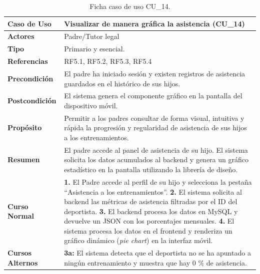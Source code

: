         \begin{table}[htbp]
        \centering
        \footnotesize
        \renewcommand{\arraystretch}{0.95}
        \begin{tabularx}{\textwidth}{|l|X|}
        \hline
        \rowcolor[HTML]{EFEFEF} 
        \textbf{Caso de Uso} & \textbf{Visualizar de manera gráfica la asistencia (CU\_14)} \\ \hline
        \textbf{Actores} & Padre/Tutor legal \\ \hline
        \textbf{Tipo} & Primario y esencial. \\ \hline
        \textbf{Referencias} & RF5.1, RF5.2, RF5.3, RF5.4 \\ \hline
        \textbf{Precondición} & El padre ha iniciado sesión y existen registros de asistencia guardados en el histórico de sus hijos. \\ \hline
        \textbf{Postcondición} & El sistema genera el componente gráfico en la pantalla del dispositivo móvil. \\ \hline
        \textbf{Propósito} & Permitir a los padres consultar de forma visual, intuitiva y rápida la progresión y regularidad de asistencia de sus hijos a los entrenamientos. \\ \hline
        \textbf{Resumen} & El padre accede al panel de asistencia de su hijo. El sistema solicita los datos acumulados al backend y genera un gráfico estadístico en la pantalla utilizando la librería de diseño. \\ \hline
        \textbf{Curso Normal} & 
        \textbf{1.} El Padre accede al perfil de su hijo y selecciona la pestaña ``Asistencia a los entrenamientos''.\newline
        \textbf{2.} El sistema solicita al backend las métricas de asistencia filtradas por el ID del deportista.\newline
        \textbf{3.} El backend procesa los datos en MySQL y devuelve un JSON con los porcentajes mensuales.\newline
        \textbf{4.} El sistema procesa los datos en el frontend y renderiza un gráfico dinámico (\textit{pie chart}) en la interfaz móvil. \\ \hline
        \textbf{Cursos Alternos} & 
        \textbf{3a:} El sistema detecta que el deportista no se ha apuntado a ningún entrenamiento y muestra que hay 0 \% de asistencia. \\ \hline
        \end{tabularx}
        \caption{Ficha caso de uso CU\_14.}
        \label{tab:cu_14}
        \end{table}

